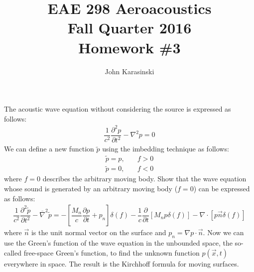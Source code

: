 \documentclass[onecolumn,10pt]{jhwhw}
\author{John Karasinski}
\title{EAE 298 Aeroacoustics \\ Fall Quarter 2016 \\ Homework \#3}
\begin{document}
\maketitle

\problem{[50 points]}
The acoustic wave equation without considering the source is expressed as follows:
\begin{align*}
\dfrac{1}{c^2} \dfrac{\partial^2 p}{\partial t^2} - \nabla^2 p = 0
\end{align*}
We can define a new function $\widetilde{p}$ using the imbedding technique as follows:
\begin{align*}
\widetilde{p} = p, & \hspace{1em} f > 0 \\
\widetilde{p} = 0, & \hspace{1em} f < 0
\end{align*}
where $f=0$ describes the arbitrary moving body. Show that the wave equation whose sound is generated by an arbitrary moving body ($f=0$) can be expressed as follows:
\begin{align*}
\dfrac{1}{c^2} \dfrac{\partial^2 \widetilde{p}}{\partial t^2}
- \overline{\nabla}^2 \widetilde{p}
= - \left [ \dfrac{M_n}{c} \dfrac{\partial p}{\partial t} + p_n \right] \delta (f)
- \dfrac{1}{c} \dfrac{\partial}{\partial t} \left[ M_n p \delta(f) \right]
- \nabla \cdot \left[ p \vec{n} \delta (f) \right]
\end{align*}
where $\vec{n}$ is the unit normal vector on the surface and $p_n = \nabla p \cdot \vec{n}$. Now we can use the Green’s function of the wave equation in the unbounded space, the so-called free-space Green’s function, to find the unknown function $p(\vec{x}, t)$ everywhere in space. The result is the Kirchhoff formula for moving surfaces.

\solution
\end{document}
